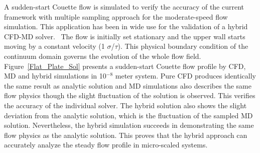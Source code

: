 \documentclass[preprint,12pt]{elsarticle}
\begin{document}
A sudden-start Couette flow is simulated to verify the accuracy of the current framework with multiple sampling approach for the moderate-speed flow simulation. This application has been in wide use for the validation of a hybrid CFD-MD solver.~\cite{Nie,Yen} The flow is initially set stationary and the upper wall starts moving by a constant velocity (1 $\sigma$/$\tau$). This physical boundary condition of the continuum domain governs the evolution of the whole flow field. Figure~\ref{Flat_Plate_Sol} presents a sudden-start Couette flow profile by CFD, MD and hybrid simulations in 10$^{-8}$ meter system. Pure CFD produces identically the same result as analytic solution and MD simulations also describes the same flow physics though the slight fluctuation of the solution is observed. This verifies the accuracy of the individual solver. The hybrid solution also shows the slight deviation from the analytic solution, which is the fluctuation of the sampled MD solution. Nevertheless, the hybrid simulation succeeds in demonstrating the same flow physics as the analytic solution. %
This proves that the hybrid approach can accurately analyze the steady flow profile in micro-scaled systems.
\end{document}
